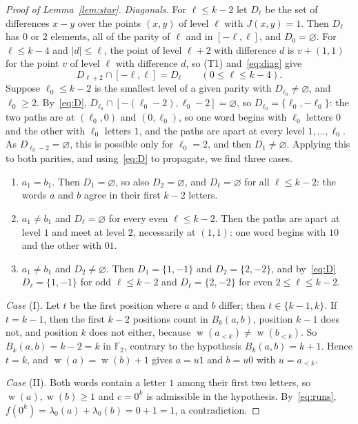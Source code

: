 \documentclass[screen]{aomart}
\theoremstyle{definition}
\theoremstyle{remark}
\numberwithin{equation}{section}
\newcommand{\F}{\mathbb{F}}
\DeclareMathOperator{\wt}{w}
\begin{document}
\begin{proof}[Proof of Lemma~\ref{lem:star}]
\emph{Diagonals.} For $\ell\le k-2$ let $D_\ell$ be the set of differences $x-y$ over the points $(x,y)$ of level $\ell$ with $J(x,y)=1$. Then $D_\ell$ has $0$ or $2$ elements, all of the parity of $\ell$ and in $[-\ell,\ell]$, and $D_0=\varnothing$. For $\ell\le k-4$ and $|d|\le\ell$, the point of level $\ell+2$ with difference $d$ is $v+(1,1)$ for the point $v$ of level $\ell$ with difference $d$, so (T1) and~\eqref{eq:diag} give
\begin{equation}\label{eq:D}
D_{\ell+2}\cap[-\ell,\ell]=D_\ell\qquad(0\le\ell\le k-4).
\end{equation}
Suppose $\ell_0\le k-2$ is the smallest level of a given parity with $D_{\ell_0}\ne\varnothing$, and $\ell_0\ge2$. By~\eqref{eq:D}, $D_{\ell_0}\cap[-(\ell_0-2),\ell_0-2]=\varnothing$, so $D_{\ell_0}=\{\ell_0,-\ell_0\}$: the two paths are at $(\ell_0,0)$ and $(0,\ell_0)$, so one word begins with $\ell_0$ letters $0$ and the other with $\ell_0$ letters $1$, and the paths are apart at every level $1,\dots,\ell_0$. As $D_{\ell_0-2}=\varnothing$, this is possible only for $\ell_0=2$, and then $D_1\ne\varnothing$. Applying this to both parities, and using~\eqref{eq:D} to propagate, we find three cases.
\begin{enumerate}[label=(\Roman*)]
\item $a_1=b_1$. Then $D_1=\varnothing$, so also $D_2=\varnothing$, and $D_\ell=\varnothing$ for all $\ell\le k-2$: the words $a$ and $b$ agree in their first $k-2$ letters.
\item $a_1\ne b_1$ and $D_\ell=\varnothing$ for every even $\ell\le k-2$. Then the paths are apart at level $1$ and meet at level $2$, necessarily at $(1,1)$: one word begins with $10$ and the other with $01$.
\item $a_1\ne b_1$ and $D_2\ne\varnothing$. Then $D_1=\{1,-1\}$ and $D_2=\{2,-2\}$, and by~\eqref{eq:D} $D_\ell=\{1,-1\}$ for odd $\ell\le k-2$ and $D_\ell=\{2,-2\}$ for even $2\le\ell\le k-2$.
\end{enumerate}

\emph{Case} (I). Let $t$ be the first position where $a$ and $b$ differ; then $t\in\{k-1,k\}$. If $t=k-1$, then the first $k-2$ positions count in $B_k(a,b)$, position $k-1$ does not, and position $k$ does not either, because $\wt(a_{<k})\ne\wt(b_{<k})$. So $B_k(a,b)=k-2=k$ in $\F_2$, contrary to the hypothesis $B_k(a,b)=k+1$. Hence $t=k$, and $\wt(a)=\wt(b)+1$ gives $a=u1$ and $b=u0$ with $u=a_{<k}$.

\emph{Case} (II). Both words contain a letter $1$ among their first two letters, so $\wt(a),\wt(b)\ge1$ and $c=0^k$ is admissible in the hypothesis. By~\eqref{eq:runs}, $f(0^k)=\lambda_0(a)+\lambda_0(b)=0+1=1$, a contradiction.


\end{proof}
\end{document}
